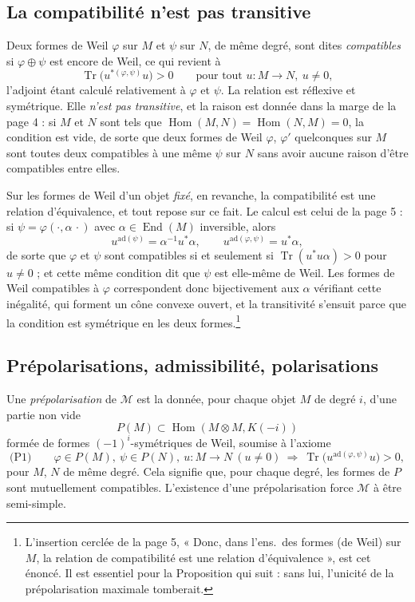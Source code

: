 \documentclass[11pt,a4paper]{article}
\begin{document}
\subsection*{La compatibilité n'est pas transitive}

Deux formes de Weil $\varphi$ sur $M$ et $\psi$ sur $N$, de même degré, sont
dites \emph{compatibles} si $\varphi \oplus \psi$ est encore de Weil, ce qui
revient à
\[
\operatorname{Tr}\bigl( u^{*(\varphi,\psi)} u \bigr) > 0
\qquad\text{pour tout } u \colon M \to N ,\ u \neq 0 ,
\]
l'adjoint étant calculé relativement à $\varphi$ et $\psi$. La relation est
réflexive et symétrique. Elle \emph{n'est pas transitive}, et la raison est
donnée dans la marge de la page 4 : si $M$ et $N$ sont tels que
$\operatorname{Hom}(M,N) = \operatorname{Hom}(N,M) = 0$, la condition est vide,
de sorte que deux formes de Weil $\varphi$, $\varphi'$ quelconques sur $M$ sont
toutes deux compatibles à une même $\psi$ sur $N$ sans avoir aucune raison
d'être compatibles entre elles.

Sur les formes de Weil d'un objet \emph{fixé}, en revanche, la compatibilité
est une relation d'équivalence, et tout repose sur ce fait.
Le calcul est celui de la page 5 : si $\psi = \varphi(\cdot, \alpha\,\cdot)$
avec $\alpha \in \operatorname{End}(M)$ inversible, alors
\[
u^{\mathrm{ad}(\psi)} = \alpha^{-1} u^{*} \alpha ,
\qquad
u^{\mathrm{ad}(\varphi,\psi)} = u^{*}\alpha ,
\]
de sorte que $\varphi$ et $\psi$ sont compatibles si et seulement si
$\operatorname{Tr}(u^{*}u\alpha) > 0$ pour $u \neq 0$ ; et cette même condition
dit que $\psi$ est elle-même de Weil. Les formes de Weil compatibles à
$\varphi$ correspondent donc bijectivement aux $\alpha$ vérifiant cette
inégalité, qui forment un cône convexe ouvert, et la transitivité s'ensuit
parce que la condition est symétrique en les deux formes.\footnote{L'insertion
cerclée de la page 5, « Donc, dans l'ens.\ des formes (de Weil) sur $M$, la
relation de compatibilité est une relation d'équivalence », est cet
énoncé. Il est essentiel pour la Proposition qui suit : sans lui, l'unicité de
la prépolarisation maximale tomberait.}

\subsection*{Prépolarisations, admissibilité, polarisations}

Une \emph{prépolarisation} de $\mathcal{M}$ est la donnée, pour chaque objet
$M$ de degré $i$, d'une partie non vide
\[
P(M) \subset \operatorname{Hom}(M \otimes M, K(-i))
\]
formée de formes $(-1)^{i}$-symétriques de Weil, soumise à l'axiome
\[
\text{(P1)}\qquad
\varphi \in P(M) ,\ \psi \in P(N) ,\ u \colon M \to N \ (u \neq 0)
\ \Longrightarrow\ \operatorname{Tr}\bigl(u^{\mathrm{ad}(\varphi,\psi)}u\bigr) > 0 ,
\]
pour $M$, $N$ de même degré. Cela signifie que, pour chaque degré, les formes
de $P$ sont mutuellement compatibles. L'existence d'une prépolarisation force
$\mathcal{M}$ à être semi-simple.
\end{document}
